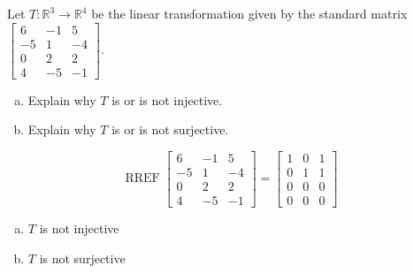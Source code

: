
\begin{exerciseStatement}
 Let \(T:\mathbb{R}^ 3  \to \mathbb{R}^ 4 \) be the linear transformation given by the standard matrix \( \left[\begin{array}{ccc}
6 & -1 & 5 \\
-5 & 1 & -4 \\
0 & 2 & 2 \\
4 & -5 & -1
\end{array}\right] .\)
\begin{enumerate}[(a)]
\item Explain why \(T\) is or is not injective.
\item Explain why \(T\) is or is not surjective.
\end{enumerate}
    
\end{exerciseStatement}
    
\begin{exerciseAnswer} 


\[\operatorname{RREF} \left[\begin{array}{ccc}
6 & -1 & 5 \\
-5 & 1 & -4 \\
0 & 2 & 2 \\
4 & -5 & -1
\end{array}\right] = \left[\begin{array}{ccc}
1 & 0 & 1 \\
0 & 1 & 1 \\
0 & 0 & 0 \\
0 & 0 & 0
\end{array}\right] \]


\begin{enumerate}[(a)]
\item \(T\) is not injective
\item \(T\) is not surjective
\end{enumerate}
    
\end{exerciseAnswer}
    
